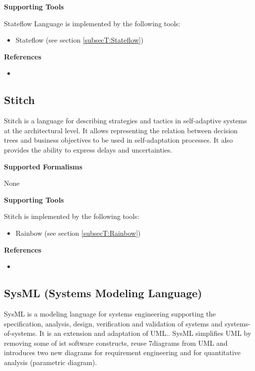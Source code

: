 \textbf{Supporting Tools}

Stateflow Language is implemented by the following tools:
\begin{itemize}
	\item Stateflow (see section \ref{subsecT:Stateflow})
\end{itemize}


\textbf{References}
\begin{itemize}
	
\item {}
\end{itemize}



\subsection{Stitch}
\label{subsecL:Stitch}


Stitch is a language for describing strategies and tactics in self-adaptive systems at the architectural level. It allows representing the relation 
between decision trees and business objectives to be used in self-adaptation processes. It also provides the ability to express delays and uncertainties.

\textbf{Supported Formalisms}

None


\textbf{Supporting Tools}

Stitch is implemented by the following tools:
\begin{itemize}
	\item Rainbow (see section \ref{subsecT:Rainbow})
\end{itemize}


\textbf{References}
\begin{itemize}
	
\item {}
\end{itemize}



\subsection{SysML (Systems Modeling Language)}
\label{subsecL:SysML}


SysML is a modeling language for systems engineering supporting the specification, analysis, design, verification and validation of systems and systems-of-systems. It is an extension and adaptation of UML.. SysML simplifies UML by removing some of ist software constructs, reuse 7diagrams from UML and introduces two new diagrams for requirement engineering and for quantitative analysis (parametric diagram).

